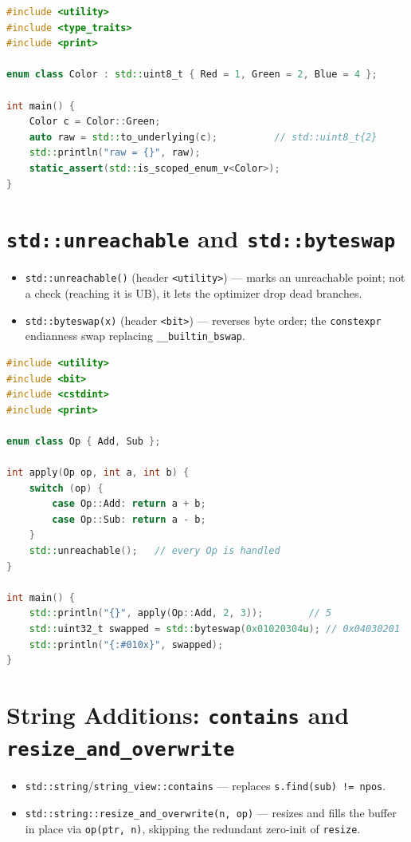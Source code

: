\begin{lstlisting}[language=C++, caption={Clean enum-to-integer conversion}]
#include <utility>
#include <type_traits>
#include <print>

enum class Color : std::uint8_t { Red = 1, Green = 2, Blue = 4 };

int main() {
    Color c = Color::Green;
    auto raw = std::to_underlying(c);          // std::uint8_t{2}
    std::println("raw = {}", raw);
    static_assert(std::is_scoped_enum_v<Color>);
}
\end{lstlisting}

\section{\texttt{std::unreachable} and \texttt{std::byteswap}}

\begin{itemize}
    \item \lstinline|std::unreachable()| (header \lstinline|<utility>|) --- marks an unreachable point; not a check (reaching it is UB), it lets the optimizer drop dead branches.
    \item \lstinline|std::byteswap(x)| (header \lstinline|<bit>|) --- reverses byte order; the \lstinline|constexpr| endianness swap replacing \lstinline|__builtin_bswap|.
\end{itemize}

\begin{lstlisting}[language=C++, caption={Optimization hint and endianness conversion}]
#include <utility>
#include <bit>
#include <cstdint>
#include <print>

enum class Op { Add, Sub };

int apply(Op op, int a, int b) {
    switch (op) {
        case Op::Add: return a + b;
        case Op::Sub: return a - b;
    }
    std::unreachable();   // every Op is handled
}

int main() {
    std::println("{}", apply(Op::Add, 2, 3));        // 5
    std::uint32_t swapped = std::byteswap(0x01020304u); // 0x04030201
    std::println("{:#010x}", swapped);
}
\end{lstlisting}

\section{String Additions: \texttt{contains} and \texttt{resize\_and\_overwrite}}

\begin{itemize}
    \item \lstinline|std::string|/\lstinline|string_view::contains| --- replaces \lstinline|s.find(sub) != npos|.
    \item \lstinline|std::string::resize_and_overwrite(n, op)| --- resizes and fills the buffer in place via \lstinline|op(ptr, n)|, skipping the redundant zero-init of \lstinline|resize|.
\end{itemize}

